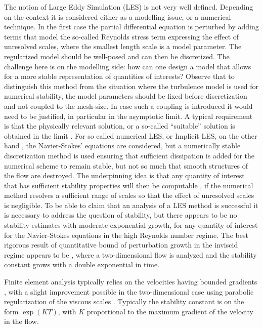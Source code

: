 \documentclass[10pt]{amsart}
\numberwithin{equation}{section}
\theoremstyle{definition}
\theoremstyle{remark}
\renewcommand{\(}{\bigl(}
\renewcommand{\)}{\bigr)}
\begin{document}
The notion of Large Eddy Simulation (LES) is not very well
defined. Depending on the context it is considered either as a modelling
issue, or a numerical technique. In the first case the partial
differential equation is perturbed by adding terms that model the
so-called Reynolds stress term expressing the 
effect of unresolved scales, where the smallest length scale is a model
parameter. The regularized model should be well-posed and can then be
discretized. The challenge here is on the modelling side: how can one
design a model that allows for a more stable representation of
quantities of interests? Observe that to distinguish this method from
the situation where the turbulence model is used for numerical
stability, the model parameters should be
fixed before discretization and not coupled to the mesh-size. In case
such a coupling is introduced it would need to be justified, in
particular in the asymptotic limit. A typical requirement is that the
physically relevant solution, or a so-called ``suitable'' solution is
obtained in the limit \cite{GP05}.
For so called numerical LES, or Implicit LES, on the other hand \cite{Bo07}, the Navier-Stokes' equations
are considered, but a numerically stable discretization method is used
ensuring that sufficient dissipation is added for the numerical scheme to
remain stable, but not so much that smooth structures of the flow are destroyed. The underpinning idea is
that any quantity of interest that has sufficient stability properties
will then be computable \cite{HJ07, Bu15}, if the numerical method
resolves a sufficient range of scales so that the effect of unresolved
scales is negligible. To be able to claim that an analysis of a LES
method is successful it is necessary to address the question of
stability, but there appears to be no stability estimates with
moderate exponential growth, for any
quantity of interest for the
Navier-Stokes equations in the high Reynolds number regime. The best rigorous result of quantitative
bound of perturbation growth in the inviscid
regime appears to be \cite{AD04}, where a two-dimensional flow is analyzed
and the stability constant grows with a double exponential in time. 

Finite element analysis typically relies on the
velocities having bounded gradients \cite{JS86, HS90}, with a slight
improvement possible in the two-dimensional case
using parabolic regularization of the viscous scales
\cite{Bu15}. Typically the stability constant is on the form
$\exp(K T)$, with $K$ proportional to the maximum gradient of the
velocity in the flow.
\end{document}
